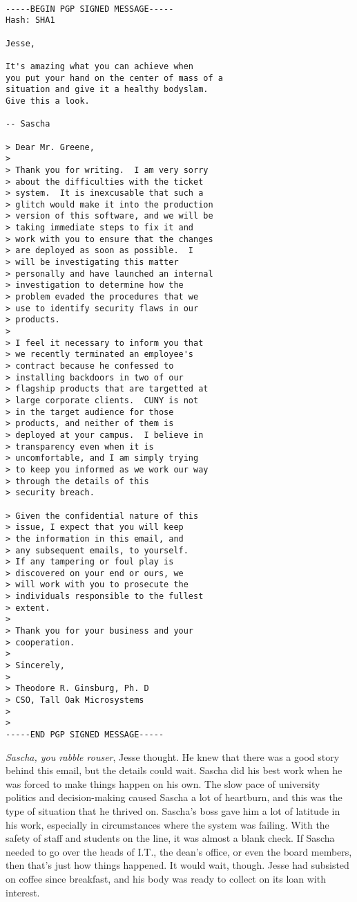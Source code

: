 \documentclass[12pt]{book}
\begin{document}
\begin{verbatim}

-----BEGIN PGP SIGNED MESSAGE-----
Hash: SHA1

Jesse,

It's amazing what you can achieve when
you put your hand on the center of mass of a
situation and give it a healthy bodyslam.
Give this a look.

-- Sascha

> Dear Mr. Greene,
>
> Thank you for writing.  I am very sorry
> about the difficulties with the ticket
> system.  It is inexcusable that such a
> glitch would make it into the production
> version of this software, and we will be
> taking immediate steps to fix it and
> work with you to ensure that the changes
> are deployed as soon as possible.  I
> will be investigating this matter
> personally and have launched an internal
> investigation to determine how the
> problem evaded the procedures that we
> use to identify security flaws in our
> products.
>
> I feel it necessary to inform you that
> we recently terminated an employee's
> contract because he confessed to
> installing backdoors in two of our
> flagship products that are targetted at
> large corporate clients.  CUNY is not
> in the target audience for those
> products, and neither of them is
> deployed at your campus.  I believe in
> transparency even when it is
> uncomfortable, and I am simply trying
> to keep you informed as we work our way
> through the details of this
> security breach.

> Given the confidential nature of this
> issue, I expect that you will keep
> the information in this email, and
> any subsequent emails, to yourself.  
> If any tampering or foul play is
> discovered on your end or ours, we
> will work with you to prosecute the
> individuals responsible to the fullest
> extent.
>
> Thank you for your business and your
> cooperation.
>
> Sincerely,
>
> Theodore R. Ginsburg, Ph. D
> CSO, Tall Oak Microsystems
>
>
-----END PGP SIGNED MESSAGE-----
\end{verbatim}

\emph{Sascha, you rabble rouser}, Jesse thought.  He knew that there was a good story behind this email, but the details could wait.  Sascha did his best work when he was forced to make things happen on his own.  The slow pace of university politics and decision-making caused Sascha a lot of heartburn, and this was the type of situation that he thrived on.  Sascha's boss gave him a lot of latitude in his work, especially in circumstances where the system was failing.  With the safety of staff and students on the line, it was almost a blank check.  If Sascha needed to go over the heads of I.T., the dean's office, or even the board members, then that's just how things happened.  It would wait, though.  Jesse had subsisted on coffee since breakfast, and his body was ready to collect on its loan with interest.
\end{document}
